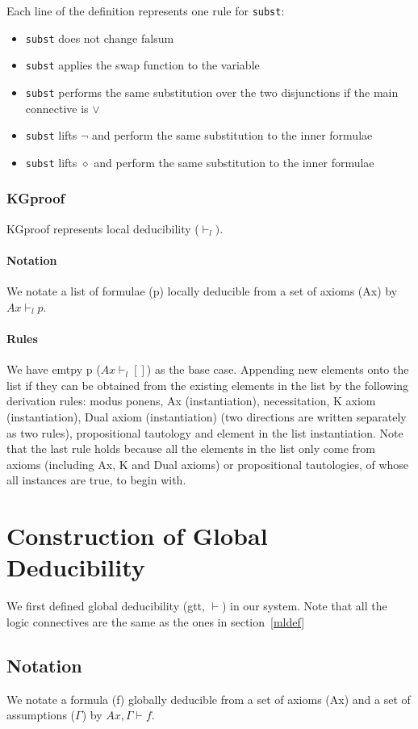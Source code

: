 \documentclass[submission,copyright,creativecommons]{eptcs}
\begin{document}
Each line of the definition represents one rule for \texttt{subst}:
\begin{itemize}
\item \texttt{subst} does not change falsum 
\item \texttt{subst} applies the swap function to the variable
\item \texttt{subst} performs the same substitution over the two disjunctions 
if the main connective is $\vee$
\item \texttt{subst} lifts $\neg$ and perform the same substitution 
to the inner formulae
\item \texttt{subst} lifts $\diamond$ and perform the same substitution 
to the inner formulae
\end{itemize}

\subsubsection{KGproof}
KGproof represents local deducibility ($\vdash_l)$.
\paragraph{Notation} We notate a list of formulae (p) locally deducible 
from a set of axioms (Ax) by $Ax \vdash_l p$. 
\paragraph{Rules} We have emtpy p ($Ax \vdash_l []$) as the base case. 
Appending new elements onto the list if they can be obtained from the existing 
elements in the list by the following derivation rules: modus ponens, Ax (instantiation), 
necessitation, K axiom (instantiation), Dual axiom (instantiation) (two directions are written separately as 
two rules), propositional tautology and element in the list instantiation. 
Note that the last rule holds because all the elements in the list only 
come from axioms (including Ax, K and Dual axioms) or propositional tautologies, 
of whose all instances are true, to begin with. 



\section{Construction of Global Deducibility}
We first defined global deducibility (gtt, $\vdash$) in our system.
Note that all the logic connectives are the same as the ones in section~\ref{mldef}
\subsection{Notation} 
We notate a formula (f) globally deducible from a set of axioms (Ax)
and a set of assumptions ($\Gamma$) by $Ax, \Gamma \vdash f$. 
\end{document}
